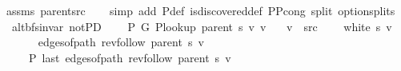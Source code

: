 \begin{isabellebody}
\endisadelimproof
%
\isatagproof
{}\isamarkupfalse%
\ assms\ parent{\isacharunderscore}{\kern0pt}src\isanewline
\ \ \isamarkupfalse%
\ {\isacharparenleft}{\kern0pt}simp\ add{\isacharcolon}{\kern0pt}\ P{\isacharprime}{\kern0pt}{\isacharunderscore}{\kern0pt}def\ is{\isacharunderscore}{\kern0pt}discovered{\isacharunderscore}{\kern0pt}def\ P{\isacharunderscore}{\kern0pt}P{\isacharprime}{\kern0pt}{\isacharprime}{\kern0pt}{\isacharunderscore}{\kern0pt}cong\ split{\isacharcolon}{\kern0pt}\ option{\isachardot}{\kern0pt}splits{\isacharparenleft}{\kern0pt}{}{\isacharparenright}{\kern0pt}{\isacharparenright}{\kern0pt}%
\endisatagproof
{\isafoldproof}%
%
\isadelimproof
\isanewline
%
\endisadelimproof
\isanewline
{}\isamarkupfalse%
\ {\isacharparenleft}{\kern0pt}\ alt{\isacharunderscore}{\kern0pt}bfs{\isacharunderscore}{\kern0pt}invar{\isacharparenright}{\kern0pt}\ not{\isacharunderscore}{\kern0pt}P{\isacharprime}{\kern0pt}D{\isacharcolon}{\kern0pt}\isanewline
\ \ \ {\isachardoublequoteopen}{\isasymnot}\ P{\isacharprime}{\kern0pt}\ G{}\ {\isacharparenleft}{\kern0pt}P{\isacharunderscore}{\kern0pt}lookup\ {\isacharparenleft}{\kern0pt}parent\ s{\isacharparenright}{\kern0pt}\ v{\isacharparenright}{\kern0pt}\ v{\isachardoublequoteclose}\isanewline
\ \ \ {\isachardoublequoteopen}v\ {\isasymnoteq}\ src{\isachardoublequoteclose}\isanewline
\ \ \ {\isachardoublequoteopen}{\isasymnot}\ white\ s\ v{\isachardoublequoteclose}\isanewline
\ \ \isanewline
\ \ \ \ {\isachardoublequoteopen}edges{\isacharunderscore}{\kern0pt}of{\isacharunderscore}{\kern0pt}path\ {\isacharparenleft}{\kern0pt}rev{\isacharunderscore}{\kern0pt}follow\ {\isacharparenleft}{\kern0pt}parent\ s{\isacharparenright}{\kern0pt}\ v{\isacharparenright}{\kern0pt}\ {\isasymnoteq}\ {\isacharbrackleft}{\kern0pt}{\isacharbrackright}{\kern0pt}{\isachardoublequoteclose}\isanewline
\ \ \ \ {\isachardoublequoteopen}{\isasymnot}\ P{\isacharprime}{\kern0pt}{\isacharprime}{\kern0pt}\ {\isacharparenleft}{\kern0pt}last\ {\isacharparenleft}{\kern0pt}edges{\isacharunderscore}{\kern0pt}of{\isacharunderscore}{\kern0pt}path\ {\isacharparenleft}{\kern0pt}rev{\isacharunderscore}{\kern0pt}follow\ {\isacharparenleft}{\kern0pt}parent\ s{\isacharparenright}{\kern0pt}\ v{\isacharparenright}{\kern0pt}{\isacharparenright}{\kern0pt}{\isacharparenright}{\kern0pt}{\isachardoublequoteclose}\isanewline
%
\isadelimproof
%
\endisadelimproof
%
\isatagproof
{}\isamarkupfalse%

\end{isabellebody}

